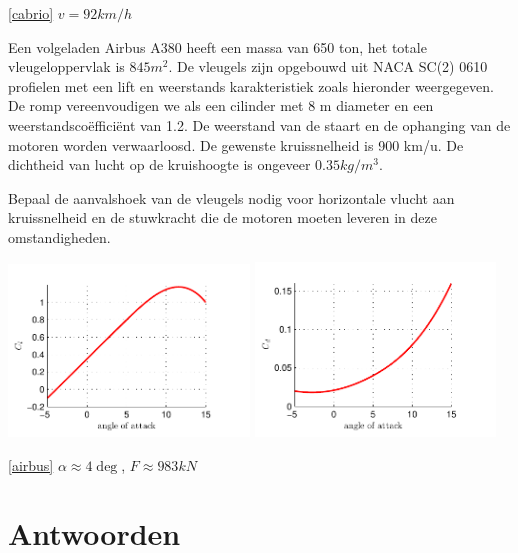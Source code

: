 \begin{antwoord}{\ref{cabrio}}
	$v=92 \unit{km/h}$
\end{antwoord}
\begin{toepassing}[*]
	\label{airbus}
Een volgeladen Airbus A380 heeft een massa van 650 ton, het totale vleugeloppervlak is $845 \unit{m^2}$. De vleugels zijn opgebouwd uit NACA SC(2) 0610 profielen met een lift en weerstands karakteristiek zoals hieronder weergegeven. De romp vereenvoudigen we als een cilinder met 8 m diameter en een weerstandscoëfficiënt van 1.2. De weerstand van de staart en de ophanging van de motoren worden verwaarloosd. De gewenste kruissnelheid is 900 km/u. De dichtheid van lucht op de kruishoogte is ongeveer $0.35 \unit{kg/m^3}$.
		
Bepaal de aanvalshoek van de vleugels nodig voor horizontale vlucht aan kruissnelheid en de stuwkracht die de motoren moeten leveren in deze omstandigheden.

	\centering
	\includegraphics[width=0.48\textwidth]{fig/uitwendige_stroming/NACA_SC(2)_0610_Cl.pdf}
	\includegraphics[width=0.48\textwidth]{fig/uitwendige_stroming/NACA_SC(2)_0610_Cd.pdf}
\end{toepassing}
\begin{antwoord}{\ref{airbus}}
	$\alpha \approx 4\deg$, $F \approx 983 \unit{kN}$
\end{antwoord}


\section*{Antwoorden}
	\begin{multicols}{2}
	\end{multicols}